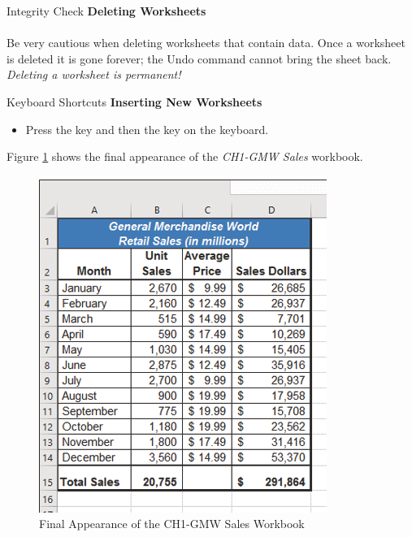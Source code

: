 \begin{center}
	\begin{infobox}{Integrity Check}
		\textbf{Deleting Worksheets}
		\\
		\\
		Be very cautious when deleting worksheets that contain data. Once a worksheet is deleted it is gone forever; the Undo command cannot bring the sheet back. \textit{Deleting a worksheet is permanent!}
	\end{infobox}
\end{center}

\begin{center}
	\begin{shtcutbox}{Keyboard Shortcuts}
		\textbf{Inserting New Worksheets}
		\\
		\begin{itemize}
			\setlength{\itemsep}{0pt}
			\setlength{\parskip}{0pt}
			\setlength{\parsep}{0pt}
			
			\item Press the  key and then the  key on the keyboard.
			
		\end{itemize}
	\end{shtcutbox}
\end{center}


Figure \ref{01:fig48} shows the final appearance of the \textit{CH1-GMW Sales} workbook.

\begin{figure}[H]
	\centering
	\includegraphics[width=\maxwidth{.95\linewidth}]{gfx/ch01_fig48}
	\caption{Final Appearance of the CH1-GMW Sales Workbook}
	\label{01:fig48}
\end{figure}

